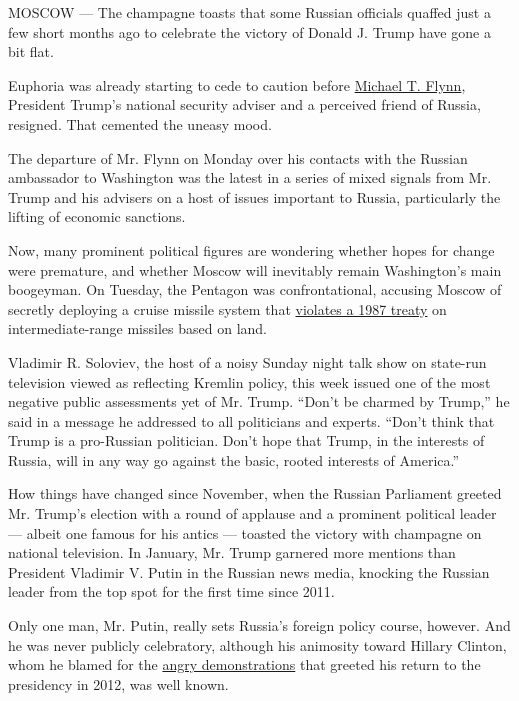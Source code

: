 MOSCOW --- The champagne toasts that some Russian officials quaffed just
a few short months ago to celebrate the victory of Donald J. Trump have
gone a bit flat.

Euphoria was already starting to cede to caution before
\href{https://www.nytimes.com/2017/02/13/us/politics/donald-trump-national-security-adviser-michael-flynn.html}{Michael
T. Flynn}, President Trump's national security adviser and a perceived
friend of Russia, resigned. That cemented the uneasy mood.

The departure of Mr. Flynn on Monday over his contacts with the Russian
ambassador to Washington was the latest in a series of mixed signals
from Mr. Trump and his advisers on a host of issues important to Russia,
particularly the lifting of economic sanctions.

Now, many prominent political figures are wondering whether hopes for
change were premature, and whether Moscow will inevitably remain
Washington's main boogeyman. On Tuesday, the Pentagon was
confrontational, accusing Moscow of secretly deploying a cruise missile
system that
\href{https://www.nytimes.com/2017/02/14/world/europe/russia-cruise-missile-arms-control-treaty.html}{violates
a 1987 treaty} on intermediate-range missiles based on land.

Vladimir R. Soloviev, the host of a noisy Sunday night talk show on
state-run television viewed as reflecting Kremlin policy, this week
issued one of the most negative public assessments yet of Mr. Trump.
``Don't be charmed by Trump,'' he said in a message he addressed to all
politicians and experts. ``Don't think that Trump is a pro-Russian
politician. Don't hope that Trump, in the interests of Russia, will in
any way go against the basic, rooted interests of America.''

How things have changed since November, when the Russian Parliament
greeted Mr. Trump's election with a round of applause and a prominent
political leader --- albeit one famous for his antics --- toasted the
victory with champagne on national television. In January, Mr. Trump
garnered more mentions than President Vladimir V. Putin in the Russian
news media, knocking the Russian leader from the top spot for the first
time since 2011.

Only one man, Mr. Putin, really sets Russia's foreign policy course,
however. And he was never publicly celebratory, although his animosity
toward Hillary Clinton, whom he blamed for the
\href{http://www.nytimes.com/2012/05/07/world/europe/at-moscow-rally-arrests-and-violence.html}{angry
demonstrations} that greeted his return to the presidency in 2012, was
well known.

